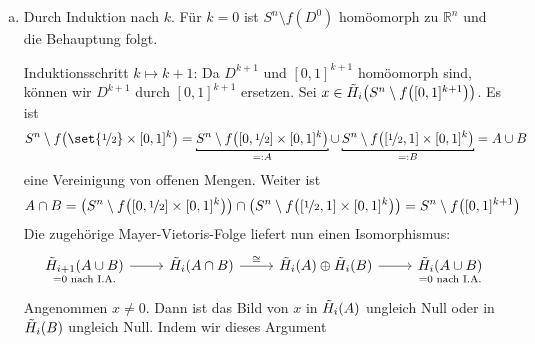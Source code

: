 \begin{beweis}[{name={von \autoref{satz:1010}}}]
	\leavevmode
	\begin{enumerate}[a)]
		\item Durch Induktion nach $k$. Für $k=0$ ist $S^n \setminus f(D^0)$ homöomorph zu $\mathbb{R}^n$ und die Behauptung folgt.
	
		Induktionsschritt $k \mapsto k+1$: Da $D^{k+1}$ und $[0,1]^{k+1}$ homöomorph sind, können wir $D^{k+1}$ durch $[0,1]^{k+1}$ ersetzen. Sei 
		$x \in \tilde{H}_i \enbrace*{S^n \setminus f \enbrace*{[0,1]^{k+1}}}$. Es ist
		\[
			S^n \setminus f \enbrace*{\set{\nicefrac{1}{2}} \times [0,1]^{k}} = \underbracket[0.8pt][1pt]{S^n \setminus f \enbrace*{\benbrace*{0,\nicefrac{1}{2}}
			\times [0,1]^k}}_{=: A} \cup \underbracket[0.8pt][1pt]{S^n \setminus f \enbrace*{\benbrace*{\nicefrac{1}{2},1} \times [0,1]^k}}_{=: B} = A \cup B
		\]
		eine Vereinigung von offenen Mengen. Weiter ist 
		\begin{align*}
			A \cap B = \enbrace*{S^n \setminus f \enbrace*{\benbrace*{0,\nicefrac{1}{2} } \times [0,1]^k} } \cap \enbrace*{S^n \setminus f 
			\enbrace*{\benbrace*{\nicefrac{1}{2} ,1} \times [0,1]^k}} =   S^n \setminus f \enbrace*{[0,1]^{k+1}}
		\end{align*}
		Die zugehörige Mayer-Vietoris-Folge liefert nun einen Isomorphismus:
		\[
			\begin{tikzcd}
				\underset{=0 \text{ nach I.A.}}{\tilde{H}_{i+1}(A \cup B)} \rar & \tilde{H}_i(A \cap B) \rar["\cong"] & \tilde{H}_i(A) \oplus \tilde{H}_i(B) \rar & 
				\underset{=0 \text{ nach I.A.}}{\tilde{H}_i(A \cup B)}
			\end{tikzcd}
		\]
		Angenommen $x \neq 0$. Dann ist das Bild von $x$ in $\tilde{H}_i \enbrace*{A}$ ungleich Null oder in $\tilde{H}_i \enbrace*{B}$ ungleich Null. Indem wir dieses Argument 

\end{enumerate}
\end{beweis}

